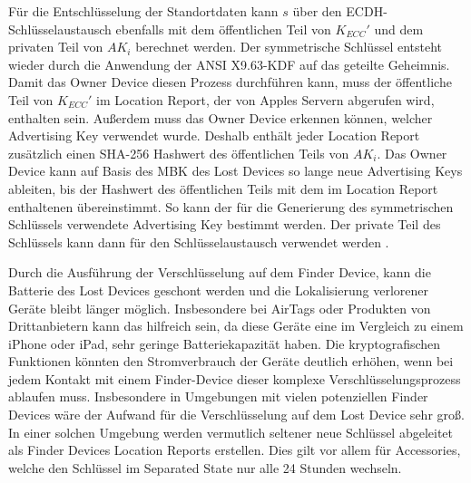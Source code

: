 Für die Entschlüsselung der Standortdaten kann $s$ über den \ac{ECDH}-Schlüsselaustausch ebenfalls mit dem öffentlichen Teil von $K_{ECC}'$ und dem privaten Teil von $AK_i$ berechnet werden.
Der symmetrische Schlüssel entsteht wieder durch die Anwendung der ANSI X9.63-\ac{KDF} auf das geteilte Geheimnis.
Damit das Owner Device diesen Prozess durchführen kann, muss der öffentliche Teil von $K_{ECC}'$ im Location Report, der von Apples Servern abgerufen wird, enthalten sein.
Außerdem muss das Owner Device erkennen können, welcher Advertising Key verwendet wurde.
Deshalb enthält jeder Location Report zusätzlich einen \ac{SHA}-256 Hashwert des öffentlichen Teils von $AK_i$.
Das Owner Device kann auf Basis des \ac{MBK} des Lost Devices so lange neue Advertising Keys ableiten, bis der Hashwert des öffentlichen Teils mit dem im Location Report enthaltenen übereinstimmt.
So kann der für die Generierung des symmetrischen Schlüssels verwendete Advertising Key bestimmt werden.
Der private Teil des Schlüssels kann dann für den Schlüsselaustausch verwendet werden \cite{Heinrich_FindMy}.


Durch die Ausführung der Verschlüsselung auf dem Finder Device, kann die Batterie des Lost Devices geschont werden und die Lokalisierung verlorener Geräte bleibt länger möglich.
Insbesondere bei AirTags oder Produkten von Drittanbietern kann das hilfreich sein, da diese Geräte eine im Vergleich zu einem iPhone oder iPad, sehr geringe Batteriekapazität haben.
Die kryptografischen Funktionen könnten den Stromverbrauch der Geräte deutlich erhöhen, wenn bei jedem Kontakt mit einem Finder-Device dieser komplexe Verschlüsselungsprozess ablaufen muss.
Insbesondere in Umgebungen mit vielen potenziellen Finder Devices wäre der Aufwand für die Verschlüsselung auf dem Lost Device sehr groß.
In einer solchen Umgebung werden vermutlich seltener neue Schlüssel abgeleitet als Finder Devices Location Reports erstellen.
Dies gilt vor allem für Accessories, welche den Schlüssel im Separated State nur alle 24 Stunden wechseln.

